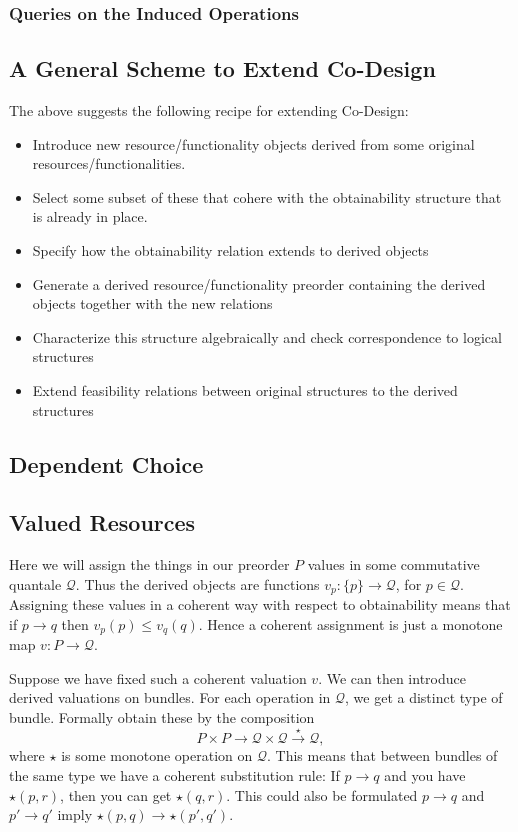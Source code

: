 \documentclass[12pt]{article}
\theoremstyle{definition}
\theoremstyle{plain}
\theoremstyle{plain}
\theoremstyle{plain}
\theoremstyle{plain}
\theoremstyle{remark}
\theoremstyle{remark}
\newcommand{\mc}[1]{\mathcal{#1}}
\begin{document}
\subsubsection{Queries on the Induced Operations}



\subsection{A General Scheme to Extend Co-Design}

The above suggests the following recipe for extending Co-Design:
\begin{itemize}
	\item Introduce new resource/functionality objects derived from some original resources/functionalities. 
	\item Select some subset of these that cohere with the obtainability structure that is already in place.
	\item Specify how the obtainability relation extends to derived objects
	\item Generate a derived resource/functionality preorder containing the derived objects together with the new relations
	\item Characterize this structure algebraically and check correspondence to logical structures
	\item Extend feasibility relations between original structures to the derived structures
\end{itemize}

\subsection{Dependent Choice}


\subsection{Valued Resources}
Here we will assign the things in our preorder $P$ values in some commutative quantale $\mathcal{Q}$. Thus the derived objects are functions $v_p:\{p\} \rightarrow \mathcal{Q}$, for $p \in \mathcal{Q}$. Assigning these values in a coherent way with respect to obtainability means that if $p \rightarrow q$ then $v_p(p) \leq v_q(q)$. Hence a coherent assignment is just a monotone map $v: P \rightarrow \mathcal{Q}$.

Suppose we have fixed such a coherent valuation $v$. We can then introduce derived valuations on bundles. For each operation in $\mathcal{Q}$, we get a distinct type of bundle. Formally obtain these by the composition
$$P \times P \rightarrow \mc{Q} \times \mc{Q} \stackrel{\star}{\rightarrow} \mc{Q},$$
where $\star$ is some monotone operation on $\mc{Q}$. This means that between bundles of the same type we have a coherent substitution rule: If $p \rightarrow q$ and you have $\star(p,r)$, then you can get $\star(q,r)$. This could also be formulated $p \rightarrow q$ and $p' \rightarrow q'$ imply $\star(p,q) \rightarrow \star(p',q')$.
\end{document}

